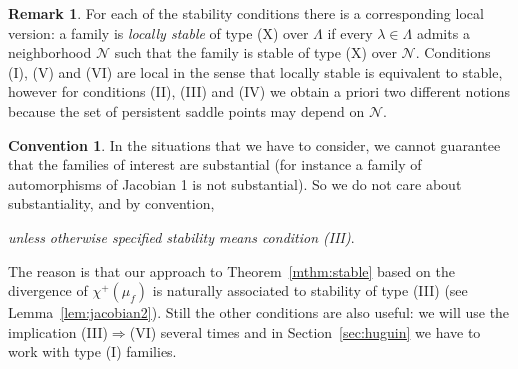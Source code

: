 \documentclass[oneside, 12pt]{amsart}
\theoremstyle{plain}
\theoremstyle{definition}
\newtheorem{rem}[thm]{Remark}
\newtheorem{convention}[thm]{Convention}
\numberwithin{equation}{section}       %
\numberwithin{equation}{section}       %
\begin{document}
\begin{rem}\label{rem:local_stability}
For each of the stability conditions there is a corresponding local version:  a family is \emph{locally 
stable} of type (X) over $\Lambda$ if  every $\lambda\in \Lambda$ admits 
 a neighborhood $\mathcal N$ such that the family is stable of type (X) over $\mathcal N$. 
Conditions (I),  (V) and (VI) are local in the sense that locally stable is equivalent to stable,  
however for   conditions  (II),  (III) and (IV) we obtain a priori  two different notions because 
 the set of persistent saddle points may depend on $\mathcal N$. 
\end{rem}


\begin{convention} 
In the situations that we have to consider, we cannot guarantee 
 that the families of interest are substantial (for instance a family of automorphisms of Jacobian 1 is not substantial).
So we do not care about substantiality, and by convention,  
\begin{center}
\emph{unless otherwise specified   stability means condition (III)}. 
\end{center}
The reason is that our approach to Theorem~\ref{mthm:stable} based on   the divergence of $\chi^+(\mu_f)$  is naturally associated to stability of type (III) (see Lemma~\ref{lem:jacobian2}). 
Still the other conditions are also useful: we will use the implication (III)$\Rightarrow$(VI) several times and    in Section~\ref{sec:huguin}  we have to work with type (I) families.  \end{convention}
\end{document}
